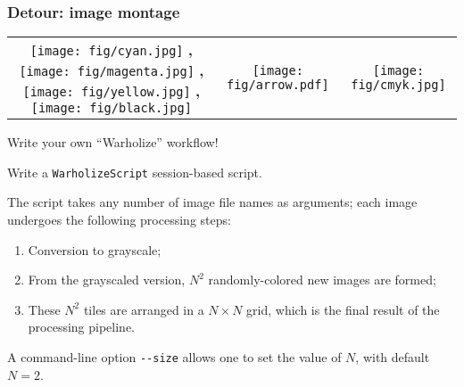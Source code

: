 \documentclass[english,serif,mathserif,xcolor=pdftex,dvipsnames,table]{beamer}
\begin{document}
\begin{frame}[fragile]
  \frametitle{Detour: image montage}


  \+
  \begin{tabular}[c]{ccc}
    \begin{minipage}[c]{0.45\linewidth}
      \texttt{[image: fig/cyan.jpg]}    \textbf{,}
      \texttt{[image: fig/magenta.jpg]} \textbf{,}
      \texttt{[image: fig/yellow.jpg]}  \textbf{,}
      \texttt{[image: fig/black.jpg]}
      \vspace{0.2\textheight}
    \end{minipage}
    &
    {\texttt{[image: fig/arrow.pdf]}}
    &
    \texttt{[image: fig/cmyk.jpg]}
  \end{tabular}
\end{frame}


\begin{frame}
  {\small Write your own ``Warholize'' workflow!}

  \small

  \+
  \begin{exercise*}[9.C]
    Write a \texttt{WarholizeScript} session-based script.

    \+
    The script takes any number of image file names as arguments;
    each image undergoes the following processing steps:
    \begin{enumerate}
    \item Conversion to grayscale;
    \item From the grayscaled version, $N^2$ randomly-colored new images are formed;
    \item These $N^2$ tiles are arranged in a $N \times N$ grid, which
      is the final result of the processing pipeline.
    \end{enumerate}

    \+
    A command-line option \texttt{-{}-size} allows one to set the
    value of $N$, with default $N=2$.
  \end{exercise*}
\end{frame}
\end{document}
